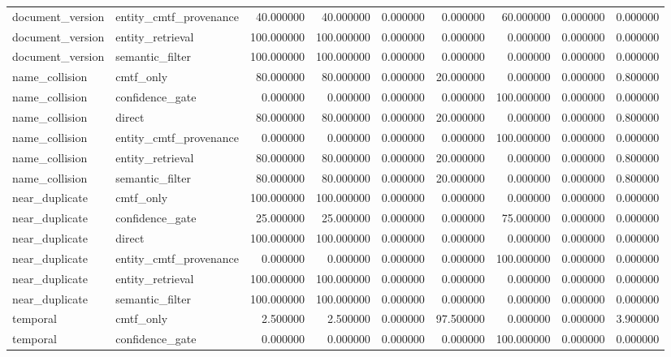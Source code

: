 \begin{tabular}{llrrrrrrr}
document_version & entity_cmtf_provenance & 40.000000 & 40.000000 & 0.000000 & 0.000000 & 60.000000 & 0.000000 & 0.000000 \\
document_version & entity_retrieval & 100.000000 & 100.000000 & 0.000000 & 0.000000 & 0.000000 & 0.000000 & 0.000000 \\
document_version & semantic_filter & 100.000000 & 100.000000 & 0.000000 & 0.000000 & 0.000000 & 0.000000 & 0.000000 \\
name_collision & cmtf_only & 80.000000 & 80.000000 & 0.000000 & 20.000000 & 0.000000 & 0.000000 & 0.800000 \\
name_collision & confidence_gate & 0.000000 & 0.000000 & 0.000000 & 0.000000 & 100.000000 & 0.000000 & 0.000000 \\
name_collision & direct & 80.000000 & 80.000000 & 0.000000 & 20.000000 & 0.000000 & 0.000000 & 0.800000 \\
name_collision & entity_cmtf_provenance & 0.000000 & 0.000000 & 0.000000 & 0.000000 & 100.000000 & 0.000000 & 0.000000 \\
name_collision & entity_retrieval & 80.000000 & 80.000000 & 0.000000 & 20.000000 & 0.000000 & 0.000000 & 0.800000 \\
name_collision & semantic_filter & 80.000000 & 80.000000 & 0.000000 & 20.000000 & 0.000000 & 0.000000 & 0.800000 \\
near_duplicate & cmtf_only & 100.000000 & 100.000000 & 0.000000 & 0.000000 & 0.000000 & 0.000000 & 0.000000 \\
near_duplicate & confidence_gate & 25.000000 & 25.000000 & 0.000000 & 0.000000 & 75.000000 & 0.000000 & 0.000000 \\
near_duplicate & direct & 100.000000 & 100.000000 & 0.000000 & 0.000000 & 0.000000 & 0.000000 & 0.000000 \\
near_duplicate & entity_cmtf_provenance & 0.000000 & 0.000000 & 0.000000 & 0.000000 & 100.000000 & 0.000000 & 0.000000 \\
near_duplicate & entity_retrieval & 100.000000 & 100.000000 & 0.000000 & 0.000000 & 0.000000 & 0.000000 & 0.000000 \\
near_duplicate & semantic_filter & 100.000000 & 100.000000 & 0.000000 & 0.000000 & 0.000000 & 0.000000 & 0.000000 \\
temporal & cmtf_only & 2.500000 & 2.500000 & 0.000000 & 97.500000 & 0.000000 & 0.000000 & 3.900000 \\
temporal & confidence_gate & 0.000000 & 0.000000 & 0.000000 & 0.000000 & 100.000000 & 0.000000 & 0.000000 \\

\end{tabular}
